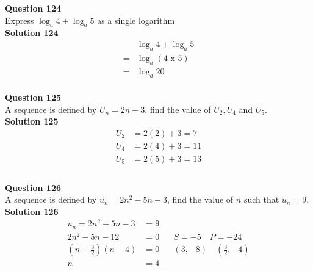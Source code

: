 \documentclass{article}
\begin{document}
\noindent\textbf{Question 124}\\[5pt]
Express $\log_{a}4+\log_{a}5$ as a single logarithm\\[5pt]
\noindent\textbf{Solution 124}\\[5pt]
\begin{align*}
&\log_{a}4+\log_{a}5\\[2pt]
=&\log_{a}(4 \,\, \text{x} \,\, 5)\\[2pt]
=&\log_{a}20
\end{align*}\\[10pt]

\noindent\textbf{Question 125}\\[5pt]
A sequence is defined by $U_n=2n+3$, find the value of $U_2, U_4$ and $U_5$.\\[5pt]
\noindent\textbf{Solution 125}\\[5pt]
\begin{align*}
U_2&=2(2)+3=7\\[2pt]
U_4&=2(4)+3=11\\[2pt]
U_5&=2(5)+3=13\\[2pt]
\end{align*}\\[10pt]

\noindent\textbf{Question 126}\\[5pt]
A sequence is defined by $u_n=2n^2-5n-3$, find the value of $n$ such that $u_n=9$.\\[5pt]
\noindent\textbf{Solution 126}\\[5pt]
\begin{align*}
u_n=2n^2-5n-3&=9\\[2pt]
2n^2-5n-12&=0\hspace{20pt}S=-5 \quad P=-24\\[2pt]
\left(n+\displaystyle\frac{3}{2}\right)(n-4)&=0\hspace{20pt} (3,-8)\quad\left(\displaystyle\frac{3}{2},-4\right)\\[2pt]
n&=4
\end{align*}\\[10pt]
\end{document}
